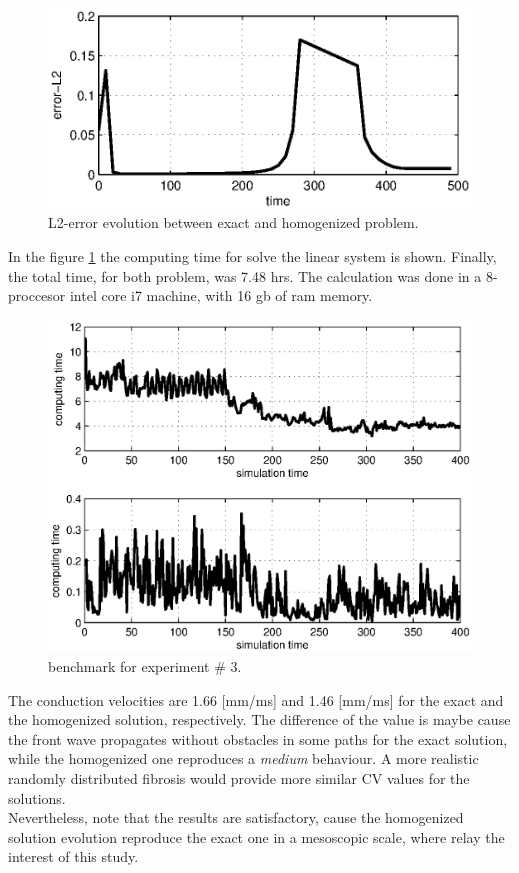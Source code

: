 \begin{figure}[H]
\centering
\includegraphics[height = 4 cm]{fig/numerical_example_MDE_MIN_exp2_error}
\caption{L2-error evolution between exact and homogenized problem.}
\end{figure}

In the figure \ref{fig:results_exp2_benchmark} the computing time for solve the linear system is shown. Finally, the total time, for both problem, was 7.48 hrs. The calculation was done in a 8-proccesor intel core i7 machine, with 16 gb of ram memory.

\begin{figure}[H]
\centering
\includegraphics[height = 7 cm]{fig/numerical_example_MDE_MIN_exp2_benchmark.eps}
\caption{benchmark for experiment \# 3.} \label{fig:results_exp2_benchmark}
\end{figure}

The conduction velocities are 1.66 [mm/ms] and 1.46 [mm/ms] for the exact and the homogenized solution, respectively. The difference of the value is maybe cause the front wave propagates without obstacles in some paths for the exact solution, while the homogenized one reproduces a \textsl{medium} behaviour. A more realistic randomly distributed fibrosis would provide more similar CV values for the solutions. \\

Nevertheless, note that the results are satisfactory, cause the homogenized solution evolution reproduce the exact one in a mesoscopic scale, where relay the interest of this study. 


